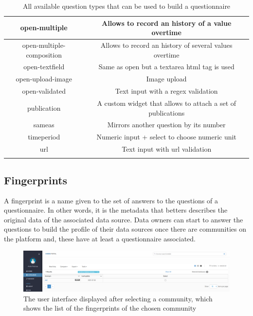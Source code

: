 \begin{longtable}[c]{|c|c|}
open-multiple                     & Allows to record an history of a value overtime             \\ \hline
open-multiple-composition         & Allows to record an history of several values overtime      \\ \hline
open-textfield                    & Same as open but a textarea html tag is used                \\ \hline
open-upload-image                 & Image upload                                                \\ \hline
open-validated                    & Text input with a regex validation                          \\ \hline
publication                       & A custom widget that allows to attach a set of publications \\ \hline
sameas                            & Mirrors another question by its number                      \\ \hline
timeperiod                        & Numeric input + select to choose numeric unit               \\ \hline
url                               & Text input with url validation                              \\ \hline
\caption{All available question types that can be used to build a questionnaire}
\label{tab:original-question-types}\\
\end{longtable}

\subsection{Fingerprints}
\label{sec:fingerprints}

A fingerprint is a name given to the set of answers to the questions of a questionnaire.
In other words, it is the metadata that betters describes the original data of the associated data source.
Data owners can start to answer the questions to build the profile of their data sources once there are communities on the platform and, these have at least a questionnaire associated.

\begin{figure}[H]
    \center
    \includegraphics[width=\textwidth]{listings}
    \caption{The user interface displayed after selecting a community, which shows the list of the fingerprints of the chosen community}
    \label{fig:listings}
\end{figure}

